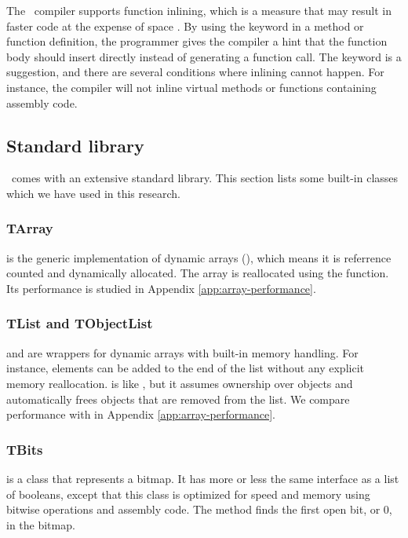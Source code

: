 The \delphi~compiler supports function inlining, which is a measure that may result in faster code at the expense of space \cite{noauthor_undated-rx}. By using the  keyword in a method or function definition, the programmer gives the compiler a hint that the function body should insert directly instead of generating a function call. The keyword is a suggestion, and there are several conditions where inlining cannot happen. For instance, the compiler will not inline virtual methods or functions containing assembly code.

\subsection{Standard library}
\label{sub:Standard library}
\delphi~comes with an extensive standard library. This section lists some built-in classes which we have used in this research.

\subsubsection{TArray}
\label{ssub:TArray}
 is the generic implementation of dynamic arrays (), which means it is referrence counted and dynamically allocated. The array is reallocated using the  function. Its performance is studied in Appendix \ref{app:array-performance}.

\subsubsection{TList and TObjectList}
\label{ssub:TList and TObjectList}
 and  are wrappers for dynamic arrays with built-in memory handling. For instance, elements can be added to the end of the list without any explicit memory reallocation.  is like , but it assumes ownership over objects and automatically frees objects that are removed from the list. We compare  performance with  in Appendix \ref{app:array-performance}.

\subsubsection{TBits}
\label{ssub:TBits}
 is a class that represents a bitmap. It has more or less the same interface as a list of booleans, except that this class is optimized for speed and memory using bitwise operations and assembly code. The  method finds the first open bit, or 0, in the bitmap.
